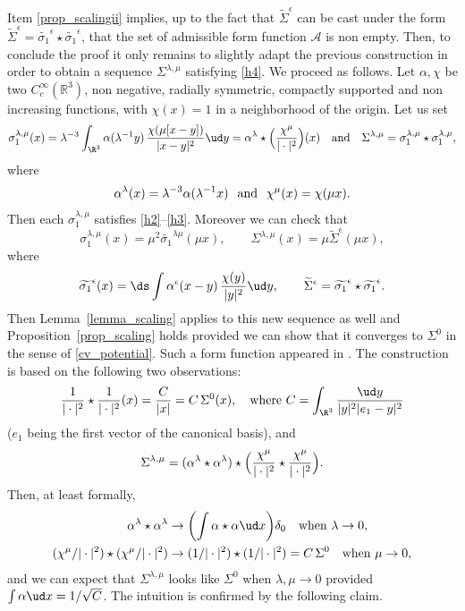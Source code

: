 Item \eqref{prop_scalingii} implies, up to the fact that $\widetilde{\Sigma}^{\epsilon}$ can be cast under the form $\widetilde{\Sigma}^{\epsilon}=\widetilde{\sigma_{1}}^{\epsilon}\star\widetilde{\sigma_{1}}^{\epsilon}$, that the set of admissible form function $\mathscr{A}$ is non empty. Then, to conclude the proof it only remains to slightly adapt the previous construction in order to obtain a sequence $\Sigma^{\lambda,\mu}$ satisfying \eqref{h4}.
We proceed as follows.
Let $\alpha, \chi$ be two $C^\infty_c(\mathbb R^3)$, non negative, radially symmetric, compactly supported and non increasing functions, with $\chi(x)=1$ in a neighborhood of the origin.
Let us set
\[
\sigma_{1}^{\lambda,\mu}(x)=\lambda^{-3}\int_{\R^{3}}\alpha(\lambda^{-1}y)\,\frac{\chi(\mu[x-y])}{|x-y|^{2}}\ud y=\alpha^{\lambda}\star\Bigl(\frac{\chi^{\mu}}{|\cdot|^{2}}\Bigr)(x)
\quad\text{and}\quad
\Sigma^{\lambda,\mu}=\sigma_{1}^{\lambda,\mu}\star\sigma_{1}^{\lambda,\mu},
\]
where
\[
\alpha^{\lambda}(x)=\lambda^{-3}\alpha(\lambda^{-1}x) \hspace{0.25cm}\text{and}\hspace{0.25cm} \chi^{\mu}(x)=\chi(\mu x).
\]
Then each $\sigma_{1}^{\lambda,\mu}$ satisfies \eqref{h2}--\eqref{h3}. Moreover we can check that
\[
\sigma_{1}^{\lambda,\mu}(x)=\mu^{2}\widetilde{\sigma_{1}}^{\lambda\mu}(\mu x),\qquad
\Sigma^{\lambda,\mu}(x)=\mu\widetilde{\Sigma}^{\epsilon}(\mu x),
\]
where
\[
\widetilde{\sigma_{1}}^{\epsilon}(x)=\ds\int \alpha^{\epsilon}(x-y)\,\frac{\chi (y)}{| y |^{2}}\ud y,
\qquad
\widetilde{\Sigma}^{\epsilon}=\widetilde{\sigma_{1}}^{\epsilon}\star\widetilde{\sigma_{1}}^{\epsilon}.
\]
Then Lemma~\ref{lemma_scaling} applies to this new sequence as well and Proposition~\ref{prop_scaling} holds
provided we can show that it
converges to $\Sigma^{0}$ in the sense of \eqref{cv_potential}.
Such a form function appeared in \cite{dBGV}. The construction is based on the following two observations:
\[
\frac{1}{|\cdot|^{2}}\star\frac{1}{|\cdot|^{2}}(x)=\frac{C}{|x|}=C\,\Sigma^{0}(x),\quad\text{where } C=\int_{\R^{3}}\frac{\ud y}{|y|^2|e_1-y|^2}
\]
($e_1$ being the first vector of the canonical basis),
and
\[
\Sigma^{\lambda,\mu}=(\alpha^{\lambda}\star\alpha^{\lambda})\star\Bigl(\frac{\chi^{\mu}}{|\cdot|^{2}}\star\frac{\chi^{\mu}}{|\cdot|^{2}}\Bigr).
\]
Then, at least formally,
\begin{align*}
\alpha^{\lambda}\star\alpha^{\lambda}&\to\biggl(\int\alpha\star\alpha\ud x\biggr)\delta_{0}\quad\text{when }\lambda\to 0,\\
(\chi^{\mu}/|\cdot|^{2})\star(\chi^{\mu}/|\cdot|^{2})&\to(1/|\cdot|^{2})\star(1/|\cdot|^{2})=C\,\Sigma^{0}\quad\text{when }\mu\to 0,
\end{align*}
and we can expect that $\Sigma^{\lambda,\mu}$ looks like
$\Sigma^{0}$ when $\lambda,\mu\to 0$ provided $\int\alpha\ud x=1/\sqrt{C}$.
The intuition is confirmed by the following claim.

